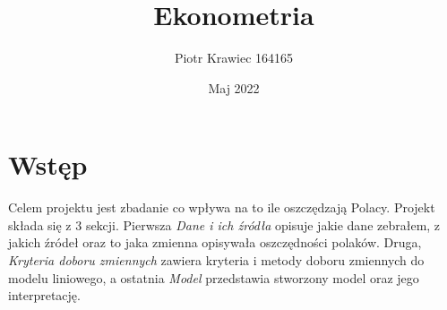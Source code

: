 \documentclass[a4paper,12pt,polish]{article}
\title{Ekonometria}
\author{Piotr Krawiec 164165}
\date{Maj 2022}
\begin{document}
\maketitle

\tableofcontents

\newpage


\section{Wstęp}
Celem projektu jest zbadanie co wpływa na to ile oszczędzają Polacy. Projekt składa się z 3 sekcji. Pierwsza \textit{Dane i ich źródła} opisuje
jakie dane zebrałem, z jakich źródeł oraz to jaka zmienna opisywała oszczędności polaków. Druga, \textit{Kryteria doboru zmiennych} zawiera
kryteria i metody doboru zmiennych do modelu liniowego, a ostatnia \textit{Model} przedstawia stworzony model oraz jego interpretację.
\end{document}
